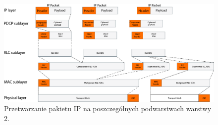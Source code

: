 \begin{figure}
	\centerline{\includegraphics[width=1.0\textwidth]{images/pdu_overview.png}}
	\caption{Przetwarzanie pakietu IP na poszczegółnych podwarstwach warstwy 2.}
	\label{fig:ip_through_layers}
\end{figure}